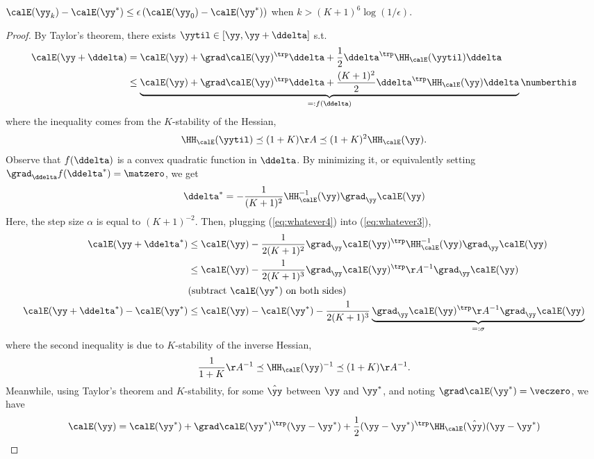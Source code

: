 \begin{theorem}
  $\calE(\yy_k)-\calE(\yy^*) \leq \epsilon \left(\calE(\yy_0)-\calE(\yy^*)\right)$ when $k>(K+1)^6\log(1/\epsilon)$.
\end{theorem}
\begin{proof}
  By Taylor's theorem, there exists $\yytil\in[\yy,\yy+\ddelta]$ s.t.\
  \begin{align*}
    \calE(\yy+\ddelta) &= \calE(\yy) + \grad\calE(\yy)^\trp\ddelta + \frac{1}{2}\ddelta^\trp \HH_{\calE}(\yytil)\ddelta \\
    &\leq \underbrace{\calE(\yy) + \grad\calE(\yy)^\trp\ddelta + \frac{(K+1)^2}{2}\ddelta^\trp \HH_{\calE}(\yy)\ddelta}_{=:f(\ddelta)} \numberthis \label{eq:whatever3}
  \end{align*}
  where the inequality comes from the $K$-stability of the Hessian,
  \[ \HH_{\calE}(\yytil) \preceq (1+K)\AA \preceq (1+K)^2\HH_{\calE}(\yy). \]
  Observe that $f(\ddelta)$ is a convex quadratic function in
  $\ddelta$. By minimizing it, or equivalently setting $\grad_{\ddelta}f(\ddelta^*) = \matzero$, we get
  \begin{equation}
    \label{eq:whatever4}
    \ddelta^* = -\frac{1}{(K+1)^2}\HH_{\calE}^{-1}(\yy)\grad_{\yy}\calE(\yy)
  \end{equation}
  Here, the step size $\alpha$ is equal to $(K+1)^{-2}$.
  Then, plugging (\ref{eq:whatever4}) into (\ref{eq:whatever3}),
  \begin{align*}
    \calE(\yy+\ddelta^*)
    &\leq \calE(\yy) - \frac{1}{2(K+1)^2}\grad_{\yy}\calE(\yy)^\trp \HH_{\calE}^{-1}(\yy) \grad_{\yy}\calE(\yy) \\
    &\leq \calE(\yy) - \frac{1}{2(K+1)^3}\grad_{\yy}\calE(\yy)^\trp \AA^{-1} \grad_{\yy}\calE(\yy) \\
    & (\text{subtract } \calE(\yy^*) \text{ on both sides}) \\
    \calE(\yy+\ddelta^*)-\calE(\yy^*) &\leq \calE(\yy)-\calE(\yy^*) - \frac{1}{2(K+1)^3}\underbrace{\grad_{\yy}\calE(\yy)^\trp \AA^{-1} \grad_{\yy}\calE(\yy)}_{=:\sigma}
  \end{align*}
  where the second inequality is due to $K$-stability of the inverse Hessian,
  \[ \frac{1}{1+K}\AA^{-1} \preceq \HH_{\calE}(\yy)^{-1} \preceq (1+K)\AA^{-1}. \]
  Meanwhile, using Taylor's theorem and $K$-stability, for some
  $\hat{\yy}$ between $\yy$ and $\yy^*$,
  and noting $\grad\calE(\yy^*) = \veczero$, we have
  \begin{align*}
    \calE(\yy) &= \calE(\yy^*) + \grad\calE(\yy^*)^\trp(\yy-\yy^*) + \frac{1}{2}(\yy-\yy^*)^\trp \HH_{\calE}(\hat{\yy})(\yy-\yy^*)  \\

\end{align*}
\end{proof}
